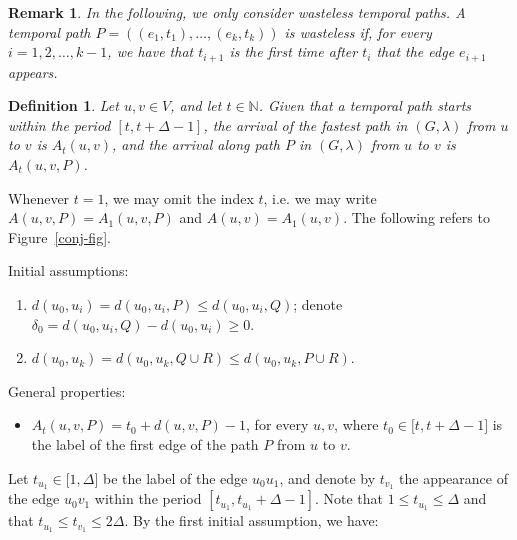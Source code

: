\documentclass{article}
\newtheorem{definition}{Definition}
\newtheorem{remark}{Remark}
\begin{document}
	
	
	\begin{remark}
		In the following, we only consider \emph{wasteless} temporal paths. A
		temporal path $P=((e_{1},t_{1}),\ldots ,(e_{k},t_{k}))$ is \emph{wasteless}
		if, for every $i=1,2,\ldots ,k-1$, we have that $t_{i+1}$ is the first time
		after $t_{i}$ that the edge $e_{i+1}$ appears.
	\end{remark}
	
	\begin{definition}
		\label{arrival-duration-def}Let $u,v\in V$, and let $t\in 
		\mathbb{N}
		$. Given that a temporal path starts within the period $[t,t+\Delta -1]$,
		the \emph{arrival} of the fastest path in $(G,\lambda )$ from $u$ to $v$ is $%
		A_{t}(u,v)$, and the \emph{arrival} along path $P$ in $(G,\lambda )$ from $u$
		to $v$ is $A_{t}(u,v,P)$.
	\end{definition}
	
	Whenever $t=1$, we may omit the index $t$, i.e. we may write $%
	A(u,v,P)=A_{1}(u,v,P)$ and $A(u,v)=A_{1}(u,v)$. The following refers to
	Figure~\ref{conj-fig}.
	
	Initial assumptions:
	
	\begin{enumerate}
		\item $d(u_{0},u_{i})=d(u_{0},u_{i},P)\leq d(u_{0},u_{i},Q)$; denote $\delta
		_{0}=d(u_{0},u_{i},Q)-d(u_{0},u_{i})\geq 0$.
		
		\item $d(u_{0},u_{k})=d(u_{0},u_{k},Q\cup R)\leq d(u_{0},u_{k},P\cup R)$.
	\end{enumerate}
	
	General properties:
	
	\begin{itemize}
		\item $A_{t}(u,v,P)=t_{0}+d(u,v,P)-1$, for every $u,v$, where $t_{0}\in
		\lbrack t,t+\Delta -1]$ is the label of the first edge of the path $P$ from $%
		u$ to $v$.
	\end{itemize}
	
	\bigskip
	
	Let $t_{u_{1}}\in \lbrack 1,\Delta ]$ be the label of the edge $u_{0}u_{1}$,
	and denote by $t_{v_{1}}$ the appearance of the edge $u_{0}v_{1}$ within the
	period $[t_{u_{1}},t_{u_{1}}+\Delta -1]$. Note that $1\leq t_{u_{1}}\leq
	\Delta $ and that $t_{u_{1}}\leq t_{v_{1}}\leq 2\Delta $. By the first
	initial assumption, we have:
	
\end{document}
